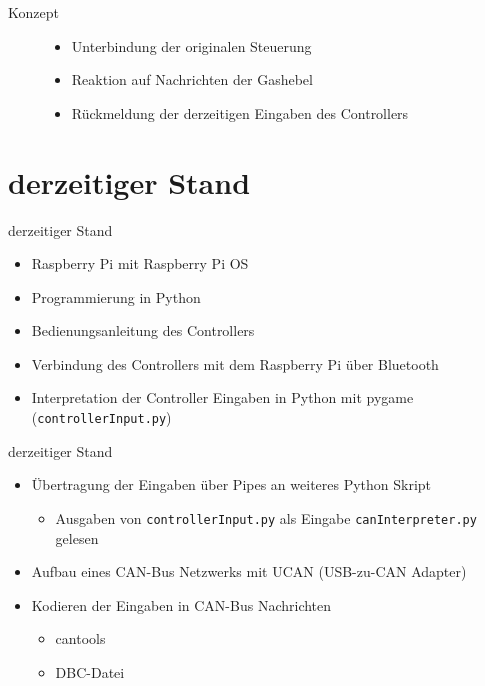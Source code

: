 \documentclass[usenames, dvipsnames, aspectratio=75]{beamer}
\begin{document}
\begin{frame}{Konzept}
    \begin{figure}
        \begin{itemize}
            \item Unterbindung der originalen Steuerung
            \item Reaktion auf Nachrichten der Gashebel
            \item Rückmeldung der derzeitigen Eingaben des Controllers
        \end{itemize}
    \end{figure}
\end{frame}

\section{derzeitiger Stand}

\begin{frame}{derzeitiger Stand}
    \begin{itemize}
        \item Raspberry Pi mit Raspberry Pi OS
        \item Programmierung in Python
        \item Bedienungsanleitung des Controllers
        \item Verbindung des Controllers mit dem Raspberry Pi über Bluetooth
        \item Interpretation der Controller Eingaben in Python mit pygame (\texttt{controllerInput.py})
    \end{itemize}
\end{frame}

\begin{frame}{derzeitiger Stand}
    \begin{itemize}
        \item Übertragung der Eingaben über Pipes an weiteres Python Skript \begin{itemize}
            \item Ausgaben von \texttt{controllerInput.py} als Eingabe \texttt{canInterpreter.py} gelesen
        \end{itemize}
        \item Aufbau eines CAN-Bus Netzwerks mit UCAN (USB-zu-CAN Adapter)
        \item Kodieren der Eingaben in CAN-Bus Nachrichten \begin{itemize}
            \item cantools
            \item DBC-Datei
        \end{itemize}
    \end{itemize}   
\end{frame}
\end{document}
